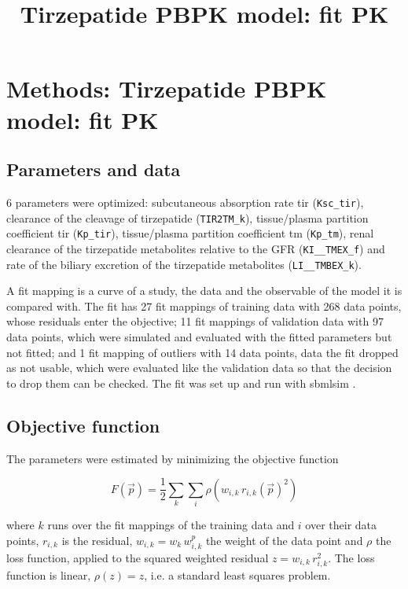 \documentclass{article}
\title{Tirzepatide PBPK model: fit PK}
\date{}
\begin{document}
\maketitle

\section{Methods: Tirzepatide PBPK model: fit PK}

\subsection{Parameters and data}

6 parameters were optimized: subcutaneous absorption rate tir (\texttt{Ksc\_tir}), clearance of the cleavage of tirzepatide (\texttt{TIR2TM\_k}), tissue/plasma partition coefficient tir (\texttt{Kp\_tir}), tissue/plasma partition coefficient tm (\texttt{Kp\_tm}), renal clearance of the tirzepatide metabolites relative to the GFR (\texttt{KI\_\_TMEX\_f}) and rate of the biliary excretion of the tirzepatide metabolites (\texttt{LI\_\_TMBEX\_k}).

A fit mapping is a curve of a study, the data and the observable of the model it is compared with. The fit has 27 fit mappings of training data with 268 data points, whose residuals enter the objective; 11 fit mappings of validation data with 97 data points, which were simulated and evaluated with the fitted parameters but not fitted; and 1 fit mapping of outliers with 14 data points, data the fit dropped as not usable, which were evaluated like the validation data so that the decision to drop them can be checked. The fit was set up and run with sbmlsim \cite{Koenig2026_sbmlsim}.

\subsection{Objective function}

The parameters were estimated by minimizing the objective function

\begin{equation}
F(\vec{p}) = \frac{1}{2} \sum_{k} \sum_{i} \rho\left(w_{i,k}\, r_{i,k}(\vec{p})^2\right)
\end{equation}

where $k$ runs over the fit mappings of the training data and $i$ over their data points, $r_{i,k}$ is the residual, $w_{i,k} = w_k\, w^{p}_{i,k}$ the weight of the data point and $\rho$ the loss function, applied to the squared weighted residual $z = w_{i,k}\, r_{i,k}^2$. The loss function is linear, $\rho(z) = z$, i.e. a standard least squares problem.
\end{document}
